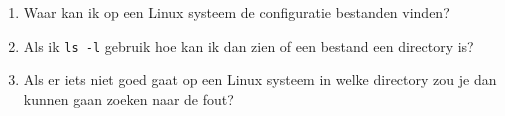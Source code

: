 \begin{enumerate}
\item Waar kan ik op een Linux systeem de configuratie bestanden vinden?
\item Als ik \texttt{ls -l} gebruik hoe kan ik dan zien of een bestand een directory is?
\item Als er iets niet goed gaat op een Linux systeem in welke directory zou je dan kunnen gaan zoeken naar de fout?
\end{enumerate}
